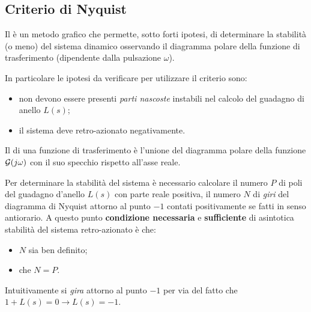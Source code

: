 	\subsection{Criterio di Nyquist}
		
		Il  è un metodo grafico che permette, sotto forti ipotesi, di determinare la stabilità (o meno) del sistema dinamico osservando il diagramma polare della funzione di trasferimento (dipendente dalla pulsazione $\omega$).
		
		In particolare le ipotesi da verificare per utilizzare il criterio sono:
		\begin{itemize}
			\item non devono essere presenti \textit{parti nascoste} instabili nel calcolo del guadagno di anello $L(s)$;
			\item il sistema deve retro-azionato negativamente.
		\end{itemize}
		
		Il  di una funzione di trasferimento è l'unione del diagramma polare della funzione $\mathcal G(j\omega)$ con il suo specchio rispetto all'asse reale.
		
		Per determinare la stabilità del sistema è necessario calcolare il numero $P$ di poli del guadagno d'anello $L(s)$ con parte reale positiva, il numero $N$ di \textit{giri} del diagramma di Nyquist attorno al punto $-1$ contati positivamente se fatti in senso antiorario. A questo punto \textbf{condizione necessaria} e \textbf{sufficiente} di asintotica stabilità del sistema retro-azionato è che:
		\begin{itemize}
			\item $N$ sia ben definito;
			\item che $N = P$.
		\end{itemize}
		
		Intuitivamente si \textit{gira} attorno al punto $-1$ per via del fatto che $1 + L(s) = 0 \rightarrow L(s) = -1$.
	

